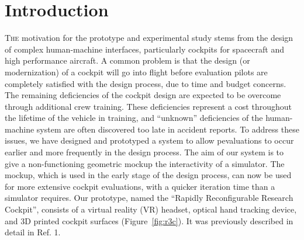 \documentclass[]{aiaa-tc}%
\begin{document}
\section{Introduction}
\lettrine[nindent=0pt]{T}{he} motivation for the prototype and experimental study stems from the design of complex human-machine interfaces, particularly cockpits for spacecraft and high performance aircraft.
A common problem is that the design (or modernization) of a cockpit will go into flight before evaluation pilots are completely satisfied with the design process, due to time and budget concerns.
The remaining deficiencies of the cockpit design are expected to be overcome through additional crew training.
These deficiencies represent a cost throughout the lifetime of the vehicle in training, and ``unknown'' deficiencies of the human-machine system are often discovered too late in accident reports.
To address these issues, we have designed and prototyped a system to allow pevaluations to occur earlier and more frequently in the design process.
The aim of our system is to give a non-functioning geometric mockup the interactivity of a simulator.
The mockup, which is used in the early stage of the design process, can now be used for more extensive cockpit evaluations, with a quicker iteration time than a simulator requires.
Our prototype, named the ``Rapidly Reconfigurable Research Cockpit'', consists of a virtual reality (VR) headset, optical hand tracking device, and 3D printed cockpit surfaces (Figure~\ref{fig:r3c}).
It was previously described in detail in Ref. 1.
\end{document}
